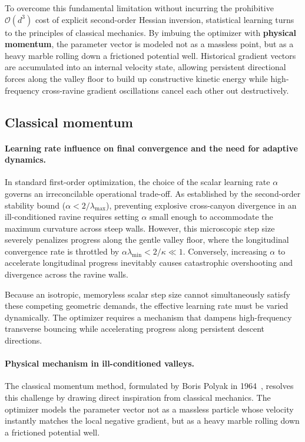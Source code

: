 To overcome this fundamental limitation without incurring the prohibitive $\mathcal{O}(d^3)$ cost of explicit second-order Hessian inversion, statistical learning turns to the principles of classical mechanics. By imbuing the optimizer with \textbf{physical momentum}, the parameter vector is modeled not as a massless point, but as a heavy marble rolling down a frictioned potential well. Historical gradient vectors are accumulated into an internal velocity state, allowing persistent directional forces along the valley floor to build up constructive kinetic energy while high-frequency cross-ravine gradient oscillations cancel each other out destructively.

\subsection{Classical momentum}
\label{sec:classical_momentum}
\label{sec:aligned_gradient_acceleration}

\paragraph{Learning rate influence on final convergence and the need for adaptive dynamics.}
In standard first-order optimization, the choice of the scalar learning rate $\alpha$ governs an irreconcilable operational trade-off. As established by the second-order stability bound ($\alpha < 2/\lambda_{\max}$), preventing explosive cross-canyon divergence in an ill-conditioned ravine requires setting $\alpha$ small enough to accommodate the maximum curvature across steep walls. However, this microscopic step size severely penalizes progress along the gentle valley floor, where the longitudinal convergence rate is throttled by $\alpha \lambda_{\min} < 2/\kappa \ll 1$. Conversely, increasing $\alpha$ to accelerate longitudinal progress inevitably causes catastrophic overshooting and divergence across the ravine walls.

Because an isotropic, memoryless scalar step size cannot simultaneously satisfy these competing geometric demands, the effective learning rate must be varied dynamically. The optimizer requires a mechanism that dampens high-frequency transverse bouncing while accelerating progress along persistent descent directions.

\paragraph{Physical mechanism in ill-conditioned valleys.}
The classical momentum method, formulated by Boris Polyak in 1964~\cite{polyak1964some}, resolves this challenge by drawing direct inspiration from classical mechanics. The optimizer models the parameter vector not as a massless particle whose velocity instantly matches the local negative gradient, but as a heavy marble rolling down a frictioned potential well.

